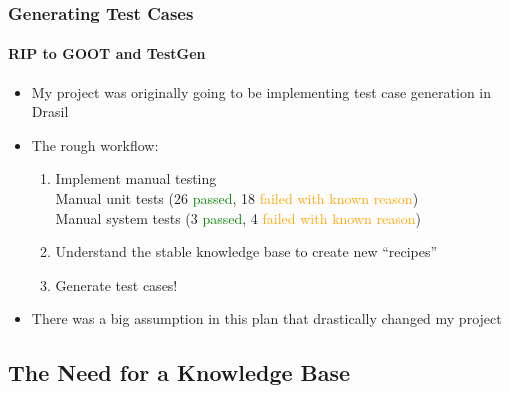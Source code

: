 \documentclass{beamer}
\begin{document}
\begin{frame}
    \frametitle{Generating Test Cases}
    \framesubtitle{RIP to GOOT and TestGen}
    \begin{itemize}
        \item My project was originally going to be implementing
              test case generation in Drasil
        \item<2-> The rough workflow:
              \begin{enumerate}
                  \item<2-> Implement manual testing \\
                        Manual unit tests (26 \textcolor{green}{passed},
                        18 \textcolor{orange}{failed with known reason}) \\
                        Manual system tests (3 \textcolor{green}{passed},
                        4 \textcolor{orange}{failed with known reason})
                  \item<3-> Understand the {stable
                                knowledge base} to create new ``recipes''
                  \item<4-> Generate test cases!
              \end{enumerate}
        \item<5-> There was a big assumption in this plan that drastically
              changed my project
    \end{itemize}
\end{frame}

\subsection{The Need for a Knowledge Base}
\end{document}

